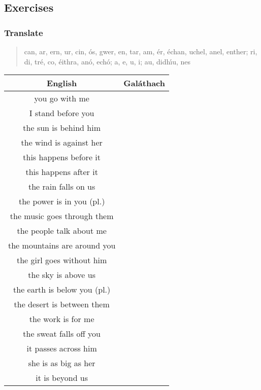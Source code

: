 \newpage
\subsection{Exercises}

\subsubsection{Translate}

\begin{quote}
can, ar, ern, ur, cin, \'{o}s, gwer, en, tar, am, \'{e}r, \'{e}chan, uchel, anel, enther; ri, di, tr\'{e}, co, \'{e}ithra, an\'{o}, ech\'{o}; a, e, u, i; au, didh\'{\i}u, nes
\end{quote}

\begin{table}[H]
\centering
\begin{tabular}{|c|M{5.0cm}|}
  \toprule
  \textbf{English} & \textbf{Gal\'{a}thach}\\
  \toprule
  you go with me & \\
  \midrule
  I stand before you & \\
  \midrule
  the sun is behind him & \\
  \midrule
  the wind is against her & \\
  \midrule
  this happens before it & \\
  \midrule
  this happens after it & \\
  \midrule
  the rain falls on us & \\
  \midrule
  the power is in you (pl.) & \\
  \midrule
  the music goes through them & \\
  \midrule
  the people talk about me & \\
  \midrule
  the mountains are around you & \\
  \midrule
  the girl goes without him & \\
  \midrule
  the sky is above us & \\
  \midrule
  the earth is below you (pl.) & \\
  \midrule
  the desert is between them & \\
  \midrule
  the work is for me & \\
  \midrule
  the sweat falls off you & \\
  \midrule
  it passes across him & \\
  \midrule
  she is as big as her & \\
  \midrule
  it is beyond us & \\

\end{tabular}
\end{table}
